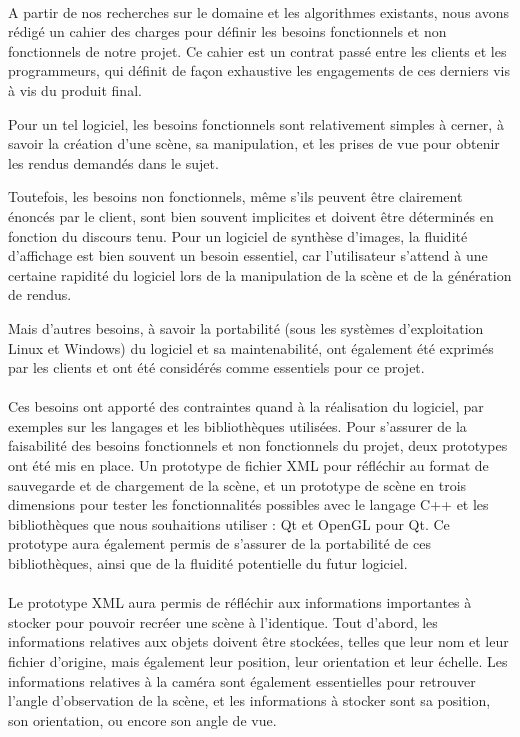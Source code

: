 \paragraph{}
        A partir de nos recherches sur le domaine et les algorithmes existants, nous avons rédigé un cahier des charges pour définir les besoins fonctionnels et non fonctionnels de notre projet. Ce cahier est un contrat passé entre les clients et les programmeurs, qui définit de façon exhaustive les engagements de ces derniers vis à vis du produit final.

        Pour un tel logiciel, les besoins fonctionnels sont relativement simples à cerner, à savoir la création d'une scène, sa manipulation, et les prises de vue pour obtenir les rendus demandés dans le sujet. 
        
        Toutefois, les besoins non fonctionnels, même s'ils peuvent être clairement énoncés par le client, sont bien souvent implicites et doivent être déterminés en fonction du discours tenu. Pour un logiciel de synthèse d'images, la fluidité d'affichage est bien souvent un besoin essentiel, car l'utilisateur s'attend à une certaine rapidité du logiciel lors de la manipulation de la scène et de la génération de rendus. 
        
        Mais d'autres besoins, à savoir la portabilité (sous les systèmes d'exploitation Linux et Windows) du logiciel et sa maintenabilité, ont également été exprimés par les clients et ont été considérés comme essentiels pour ce projet.

\paragraph{}
        Ces besoins ont apporté des contraintes quand à la réalisation du logiciel, par exemples sur les langages et les bibliothèques utilisées.
        Pour s'assurer de la faisabilité des besoins fonctionnels et non fonctionnels du projet, deux prototypes ont été mis en place. Un prototype de fichier XML pour réfléchir au format de sauvegarde et de chargement de la scène, et un prototype de scène en trois dimensions pour tester les fonctionnalités possibles avec le langage C++ et les bibliothèques que nous souhaitions utiliser : Qt et OpenGL pour Qt. Ce prototype aura également permis de s'assurer de la portabilité de ces bibliothèques, ainsi que de la fluidité potentielle du futur logiciel.

\paragraph{}
        Le prototype XML aura permis de réfléchir aux informations importantes à stocker pour pouvoir recréer une scène à l'identique. Tout d'abord, les informations relatives aux objets doivent être stockées, telles que leur nom et leur fichier d'origine, mais également leur position, leur orientation et leur échelle. Les informations relatives à la caméra sont également essentielles pour retrouver l'angle d'observation de la scène, et les informations à stocker sont sa position, son orientation, ou encore son angle de vue. 
        
